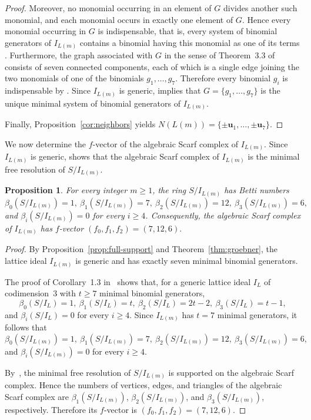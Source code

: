 \documentclass[12pt,a4paper]{amsart}
\newtheorem{proposition}[theorem]{Proposition}
\theoremstyle{definition}
\begin{document}
\begin{proof}
Moreover, no monomial occurring in an element of $G$ divides another
such monomial, and each monomial occurs in exactly one element of $G$.
Hence every monomial occurring in $G$ is indispensable, that is, every
system of binomial generators of $I_{L(m)}$ contains a binomial having
this monomial as one of its terms
\cite[Remark~2.3]{CTV}. Furthermore, the graph associated with $G$ in
the sense of Theorem~3.3 of~\cite{CTV} consists of seven connected
components, each of which is a single edge joining the two monomials
of one of the binomials $g_1,\ldots,g_7$. Therefore every binomial
$g_i$ is indispensable by \cite[Theorem~3.3]{CTV}. Since
$I_{L(m)}$ is generic, \cite[Remark~4.4(3)]{PS}
implies that $G=\{g_1,\ldots,g_7\}$ is the unique minimal system of
binomial generators of $I_{L(m)}$. 

Finally, Proposition~\ref{cor:neighbors} yields
$
N(L(m))=\{\pm\mathbf u_1,\ldots,\pm\mathbf u_7\}.$
\end{proof}

We now determine the $f$-vector of the algebraic Scarf complex of
$I_{L(m)}$. Since $I_{L(m)}$ is generic, \cite[Theorem~4.2]{PS} shows that the algebraic Scarf complex of
$I_{L(m)}$ is the minimal free resolution of $S/I_{L(m)}$.


\begin{proposition}\label{prop:scarf}
For every integer $m\ge1$, the ring $S/I_{L(m)}$ has Betti numbers
$$
\beta_0(S/I_{L(m)})=1, \ \beta_1(S/I_{L(m)})=7, \ \beta_2(S/I_{L(m)})=12, \ \beta_3(S/I_{L(m)})=6,$$ and
$
\beta_i(S/I_{L(m)})=0$ for every $i \geq 4$. Consequently, the algebraic Scarf complex of $I_{L(m)}$ has
$f$-vector
$
(f_0,f_1,f_2)=(7,12,6).$
\end{proposition}
 
\begin{proof} By Proposition~\ref{prop:full-support} and
Theorem~\ref{thm:groebner}, the lattice ideal $I_{L(m)}$ is generic
and has exactly seven minimal binomial generators.

The proof of Corollary~1.3 in~\cite{Ojeda} shows that, for a generic
lattice ideal $I_L$ of codimension~$3$ with $t\ge7$ minimal binomial
generators,
\[
\beta_0(S/I_L)=1, \
\beta_1(S/I_L)=t, \
\beta_2(S/I_L)=2t-2, \
\beta_3(S/I_L)=t-1,
\]
and
$
\beta_i(S/I_L)=0$ for every $i \geq 4$.
Since $I_{L(m)}$ has $t=7$ minimal generators, it follows that
\[
\beta_0(S/I_{L(m)})=1, \
\beta_1(S/I_{L(m)})=7, \
\beta_2(S/I_{L(m)})=12, \
\beta_3(S/I_{L(m)})=6,
\]
and
$
\beta_i(S/I_{L(m)})=0$ for every $i \geq 4$.

By~\cite[Theorem~4.2]{PS}, the minimal free resolution of
$S/I_{L(m)}$ is supported on the algebraic Scarf complex.
Hence the numbers of vertices, edges, and triangles of the algebraic
Scarf complex are
$\beta_1(S/I_{L(m)})$,
$\beta_2(S/I_{L(m)})$, and
$\beta_3(S/I_{L(m)})$, respectively.
Therefore its $f$-vector is $
(f_0,f_1,f_2)=(7,12,6).$
\end{proof}
\end{document}
